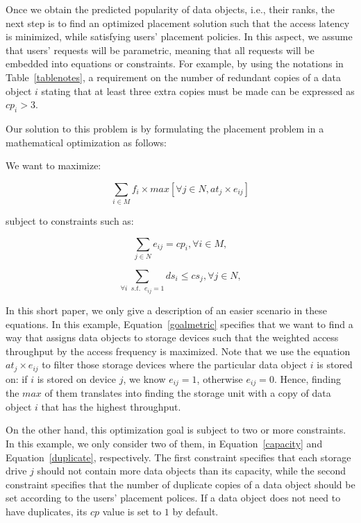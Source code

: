 Once we obtain the predicted popularity of data objects, i.e., their ranks, the next step is to find an optimized placement solution such that the access latency is minimized, while satisfying users' placement policies. In this aspect, we assume that users' requests will be parametric, meaning that all requests will be embedded into equations or constraints. For example, by using the notations in Table~\ref{tablenotes}, a requirement on the number of redundant copies of a data object $i$ stating that at least three extra copies must be made can be expressed as $cp_i > 3$.

Our solution to this problem is by formulating the placement problem in a mathematical optimization as follows:

We want to maximize:

\begin{equation}
\sum\limits_{i \in M} f_i \times max[\forall j \in N, at_j\times e_{ij} ]
\label{goalmetric}
\end{equation}

subject to constraints such as:

\begin{equation}
\sum\limits_{j\in N} e_{ij} = cp_i, \forall i \in M,
\label{capacity}
\end{equation}

\begin{equation}
\sum\limits_{\forall i \;\; s.t.\;\; e_{ij} = 1} ds_i \le cs_j, \forall j \in N, \label{duplicate}
\end{equation}

In this short paper, we only give a description of an easier scenario in these equations. In this example, Equation~\ref{goalmetric} specifies that we want to find a way that assigns data objects to storage devices such that the weighted access throughput by the access frequency is maximized.  Note that we use the equation $at_j\times e_{ij}$ to filter those storage devices where the particular data object $i$ is stored on: if $i$ is stored on device $j$, we know $e_{ij}=1$, otherwise $e_{ij}=0$. Hence, finding the $max$ of them translates into finding the storage unit with a copy of data object $i$ that has the highest throughput.

On the other hand, this optimization goal is subject to two or more constraints. In this example, we only consider two of them, in Equation~\ref{capacity} and Equation~\ref{duplicate}, respectively. The first constraint specifies that each storage drive $j$ should not contain more data objects than its capacity, while the second constraint specifies that the number of duplicate copies of a data object should be set according to the users' placement polices. If a data object does not need to have duplicates, its $cp$ value is set to $1$ by default.

